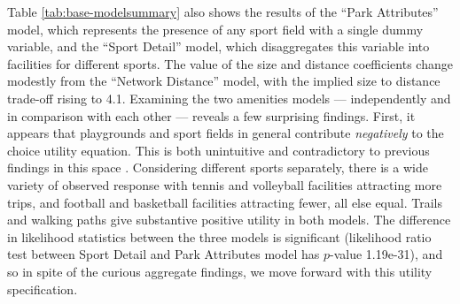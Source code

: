 \documentclass[3p, authoryear, review]{elsarticle} %
\begin{document}
Table \ref{tab:base-modelsummary} also shows the results of the ``Park
Attributes'' model, which represents the presence of any sport field with a
single dummy variable, and the ``Sport Detail'' model, which disaggregates this
variable into facilities for different sports. The value of the size and
distance coefficients change modestly from the ``Network Distance'' model, with
the implied size to distance trade-off rising to 4.1. Examining
the two amenities models --- independently and in comparison with each other ---
reveals a few surprising findings. First, it appears that playgrounds and sport
fields in general contribute \emph{negatively} to the choice utility equation. This
is both unintuitive and contradictory to previous findings in this space \citep[e.g.,][]{Kinnell2006}. Considering different sports separately, there is a wide variety
of observed response with tennis and volleyball facilities attracting more
trips, and football and basketball facilities attracting fewer, all else equal.
Trails and walking paths give substantive positive utility in both models. The
difference in likelihood statistics between the three models is significant
(likelihood ratio test between Sport Detail and Park Attributes model has
\(p\)-value 1.19e-31), and so in spite of the curious aggregate findings,
we move forward with this utility specification.
\end{document}
